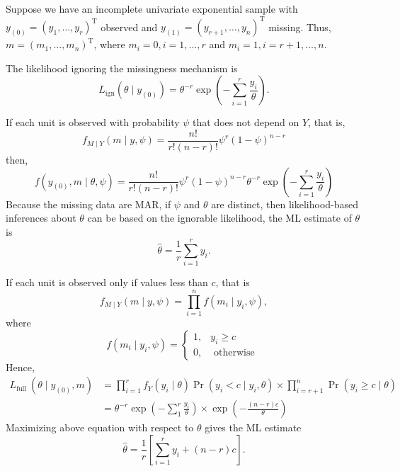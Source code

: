 \begin{example}
	Suppose we have an incomplete univariate exponential sample with $y_{(0)}=\left(y_{1},\ldots,y_{r}\right)^{\mathrm{T}}$ observed and $y_{(1)}=\left(y_{r+1},\ldots,y_{n}\right)^{\mathrm{T}}$ missing. Thus, $m=\left(m_{1},\ldots,m_{n}\right)^{\mathrm{T}}$, where $m_{i}=0,i=1,\ldots,r$ and $m_{i}=1,i=r+1,\ldots,n$.

	The likelihood ignoring the missingness mechanism is
	\begin{equation}
		L_{\mathrm{ign}}\left(\theta\mid y_{(0)}\right)=\theta^{-r}\exp\left(-\sum_{i=1}^{r}\frac{y_{i}}{\theta}\right).
	\end{equation}

	If each unit is observed with probability $\psi$ that does not depend on $Y$, that is,
	\begin{equation}
		f_{M\mid Y}(m\mid y,\psi)=\frac{n!}{r!(n-r)!}\psi^{r}(1-\psi)^{n-r}
	\end{equation}
	then,
	\begin{equation}
		f\left(y_{(0)},m\mid\theta,\psi\right)=\frac{n!}{r!(n-r)!}\psi^{r}(1-\psi)^{n-r}\theta^{-r}\exp\left(-\sum_{i=1}^{r}\frac{y_{i}}{\theta}\right)
	\end{equation}
	Because the missing data are MAR, if $\psi$ and $\theta$ are distinct, then likelihood-based
	inferences about $\theta$ can be based on the ignorable likelihood, the ML estimate of $\theta$ is
	\begin{equation}
		\hat{\theta}=\frac{1}{r}\sum_{i=1}^{r}y_{i}.
	\end{equation}

	If each unit is observed only if values less than $c$, that is
	\begin{equation}
		f_{M\mid Y}(m\mid y,\psi)=\prod_{i=1}^{n}f\left(m_{i}\mid y_{i},\psi\right),
	\end{equation}
	where
	\begin{equation}
		f\left(m_{i} \mid y_{i}, \psi\right)=\left\{\begin{array}{ll}
			1, & y_{i}\geq c        \\
			0, & \text{ otherwise }
		\end{array}\right.
	\end{equation}
	Hence,
	\begin{equation}
		\begin{aligned}
			L_{\text {full }}\left(\theta \mid y_{(0)}, m\right) & =\prod_{i=1}^{r} f_{Y}\left(y_{i} \mid \theta\right) \operatorname{Pr}\left(y_{i}<c \mid y_{i}, \theta\right) \times \prod_{i=r+1}^{n} \operatorname{Pr}\left(y_{i} \geq c \mid \theta\right) \\
			                                                     & =\theta^{-r} \exp \left(-\sum_{1}^{r} \frac{y_{i}}{\theta}\right) \times \exp \left(-\frac{(n-r) c}{\theta}\right)
		\end{aligned}
	\end{equation}
	Maximizing above equation with respect to $\theta$ gives the ML estimate
	\begin{equation}
		\hat{\theta}=\frac{1}{r}\left[\sum_{i=1}^{r}y_{i}+(n-r)c\right].
	\end{equation}


\end{example}
